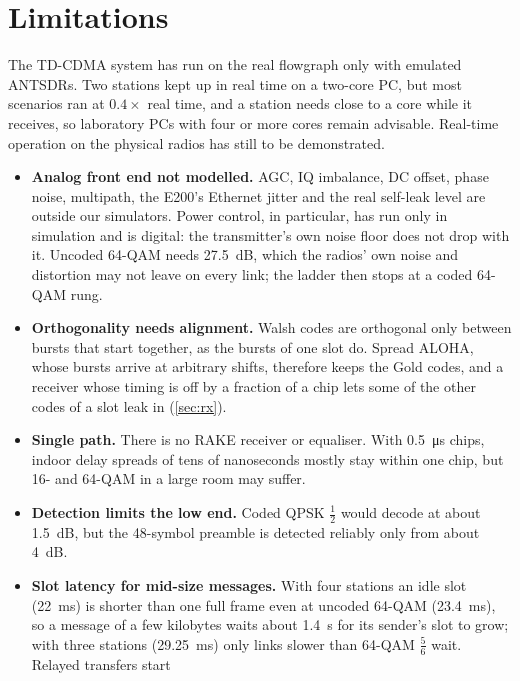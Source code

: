 \documentclass[11pt,a4paper,oneside]{report}
\begin{document}
\section{Limitations}
\begin{warnbox}
The TD-CDMA system has run on the real flowgraph only with emulated ANTSDRs. Two stations kept up in
real time on a two-core PC, but most scenarios ran at $0.4\times$ real time, and a station needs close to
a core while it receives, so laboratory PCs with four or more cores remain advisable. Real-time
operation on the physical radios has still to be demonstrated.
\end{warnbox}

\begin{itemize}
  \item \textbf{Analog front end not modelled.} AGC, IQ imbalance, DC offset, phase noise, multipath, the
        E200's Ethernet jitter and the real self-leak level are outside our simulators. Power control,
        in particular, has run only in simulation and is digital: the transmitter's own noise floor does
        not drop with it. Uncoded 64-QAM needs \SI{27.5}{dB}, which the radios' own noise and
        distortion may not leave on every link; the ladder then stops at a coded 64-QAM rung.
  \item \textbf{Orthogonality needs alignment.} Walsh codes are orthogonal only between bursts that start
        together, as the bursts of one slot do. Spread ALOHA, whose bursts arrive at arbitrary shifts,
        therefore keeps the Gold codes, and a receiver whose timing is off by a fraction of a chip lets
        some of the other codes of a slot leak in (\cref{sec:rx}).
  \item \textbf{Single path.} There is no RAKE receiver or equaliser. With \SI{0.5}{\micro s} chips,
        indoor delay spreads of tens of nanoseconds mostly stay within one chip, but 16- and 64-QAM in a
        large room may suffer.
  \item \textbf{Detection limits the low end.} Coded QPSK $\tfrac12$ would decode at about \SI{1.5}{dB}, but
        the 48-symbol preamble is detected reliably only from about \SI{4}{dB}.
  \item \textbf{Slot latency for mid-size messages.} With four stations an idle slot (\SI{22}{ms}) is
        shorter than one full frame even at uncoded 64-QAM (\SI{23.4}{ms}), so a message of a few
        kilobytes waits about \SI{1.4}{s} for its sender's slot to grow; with three stations
        (\SI{29.25}{ms}) only links slower than 64-QAM $\tfrac56$ wait. Relayed transfers start

\end{itemize}
\end{document}
